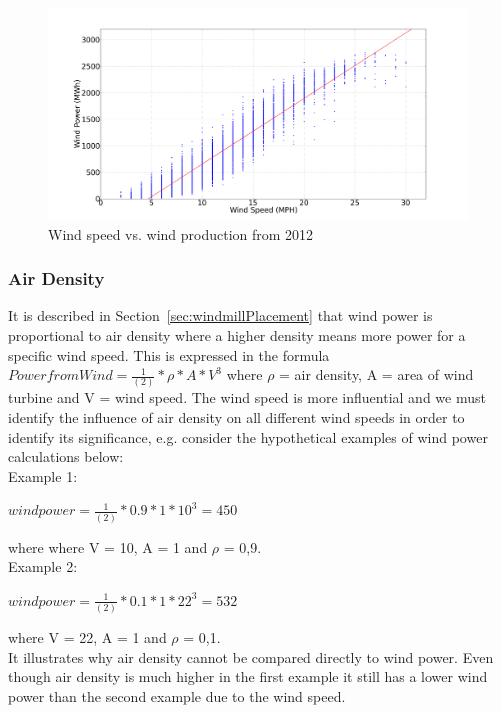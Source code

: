 \begin{figure}[h!]
\centering
\includegraphics[width=0.99\textwidth]{billeder/WindSpeedVsProduction.png}
\caption{Wind speed vs. wind production from 2012}
\label{fig:windVsProd}
\end{figure}

\subsubsection{Air Density}
\label{sec:airDensity}
It is described in Section~\ref{sec:windmillPlacement} that wind power is proportional to air density where a higher density means more power for a specific wind speed. This is expressed in the formula $Power from Wind=\frac{1}{(2)}*\rho*A*V^3$ where $\rho$ = air density, A = area of wind turbine and V = wind speed. The wind speed is more influential and we must identify the influence of air density on all different wind speeds in order to identify its significance, e.g. consider the hypothetical examples of wind power calculations below:
\\[0.5cm]
\noindent Example 1:

\begin{center}
$wind power = \frac{1}{(2)}*0.9*1*10^3 = 450$
\end{center}

\noindent where where V = 10, A = 1 and $\rho$ =  0,9.
\\[0.5cm]
\noindent Example 2: 

\begin{center}
$wind power = \frac{1}{(2)}*0.1*1*22^3 = 532$
\end{center}

\noindent where V = 22, A = 1 and $\rho$ =  0,1.
\\[0.5cm]
\noindent It illustrates why air density cannot be compared directly to wind power. Even though air density is much higher in the first example it still has a lower wind power than the second example due to the wind speed.

